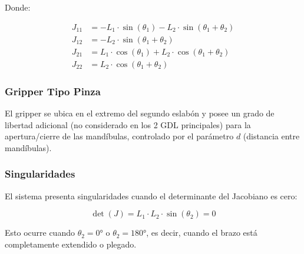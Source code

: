 Donde:

\begin{align}
    J_{11} &= -L_1 \cdot \sin(\theta_1) - L_2 \cdot \sin(\theta_1 + \theta_2) \\
    J_{12} &= -L_2 \cdot \sin(\theta_1 + \theta_2) \\
    J_{21} &= L_1 \cdot \cos(\theta_1) + L_2 \cdot \cos(\theta_1 + \theta_2) \\
    J_{22} &= L_2 \cdot \cos(\theta_1 + \theta_2)
\end{align}

\subsubsection{Gripper Tipo Pinza}

El gripper se ubica en el extremo del segundo eslabón y posee un grado de libertad adicional (no considerado en los 2 GDL principales) para la apertura/cierre de las mandíbulas, controlado por el parámetro $d$ (distancia entre mandíbulas).

\subsubsection{Singularidades}

El sistema presenta singularidades cuando el determinante del Jacobiano es cero:

\begin{equation}
    \det(J) = L_1 \cdot L_2 \cdot \sin(\theta_2) = 0
\end{equation}

Esto ocurre cuando $\theta_2 = 0°$ o $\theta_2 = 180°$, es decir, cuando el brazo está completamente extendido o plegado.

